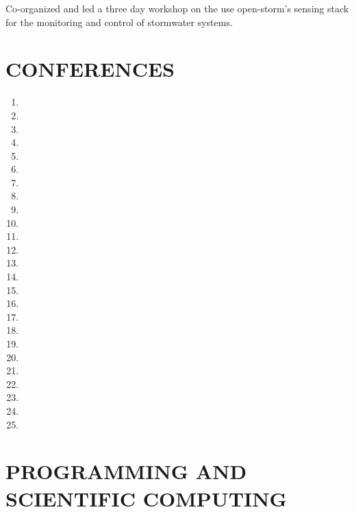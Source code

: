 \documentclass{my_cv}
\begin{document}
Co-organized and led a three day workshop on the use open-storm's sensing stack for the monitoring and control of stormwater systems.

\section*{CONFERENCES}
\begin{enumerate}
	\item {}
	\item {}
	\item {}
	\item {}
	\item {}
	\item {}
	\item {}
	\item {}
	\item {}
	\item {}
	\item {}
	\item {}
	\item {}
	\item {}
	\item {}
	\item {}
	\item {}
	\item {}
	\item {}
	\item {}
	\item {}
	\item {}
	\item {}
	\item {}
	\item {}
\end{enumerate}



\section*{PROGRAMMING AND SCIENTIFIC COMPUTING}
\end{document}
